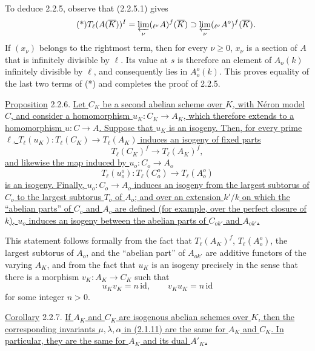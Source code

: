 To deduce 2.2.5, observe that (2.2.5.1) gives
\begin{equation}\tag{*}
 T_\ell(A(\overline K))^I
 =\varprojlim_\nu({}_{\ell^\nu}A)^f(\overline K)
 \supset\varprojlim_\nu({}_{\ell^\nu}A^o)^f(\overline K).
\end{equation}
If $(x_\nu)$ belongs to the rightmost term, then for every
$\nu\geq0$, $x_\nu$ is a section of $A$ that is infinitely divisible
by $\ell$.  Its value at $s$ is therefore an element of $A_o(k)$
infinitely divisible by $\ell$, and consequently lies in $A_o^o(k)$.
This proves equality of the last two terms of (*) and completes the
proof of 2.2.5.

\medskip
\noindent
\underline{Proposition} 2.2.6. \underline{Let $C_K$ be a second
abelian scheme over $K$, with N\'{e}ron model $C$, and consider a
homomorphism $u_K:C_K\longrightarrow A_K$, which therefore extends to
a homomorphism $u:C\longrightarrow A$.  Suppose that $u_K$ is an
isogeny.  Then, for every prime $\ell$,
$T_\ell(u_K):T_\ell(C_K)\longrightarrow T_\ell(A_K)$ induces an
isogeny of fixed parts}
\begin{equation}\tag{2.2.6.1}
 T_\ell(C_K)^f\longrightarrow T_\ell(A_K)^f,
\end{equation}
\underline{and likewise the map induced by
$u_o:C_o\longrightarrow A_o$}
\begin{equation}\tag{2.2.6.2}
 T_\ell(u_o^o):T_\ell(C_o^o)\longrightarrow T_\ell(A_o^o)
\end{equation}
\underline{is an isogeny.  Finally, $u_o:C_o\longrightarrow A_o$
induces an isogeny from the largest subtorus of $C_o$ to the largest
subtorus $T_o$ of $A_o$; and over an extension $k'/k$ on which the
``abelian parts'' of $C_o$ and $A_o$ are defined (for example, over
the perfect closure of $k$), $u_o$ induces an isogeny between the
abelian parts of $C_{ok'}$ and $A_{ok'}$.}

This statement follows formally from the fact that
$T_\ell(A_K)^f$, $T_\ell(A_o^o)$, the largest subtorus of $A_o$, and
the ``abelian part'' of $A_{ok'}$ are additive functors of the varying
$A_K$, and from the fact that $u_K$ is an isogeny precisely in the
sense that there is a morphism $v_K:A_K\longrightarrow C_K$ such that
\[
 u_Kv_K=n\,\mathrm{id},\qquad v_Ku_K=n\,\mathrm{id}
\]
for some integer $n>0$.

\medskip
\noindent
\underline{Corollary} 2.2.7. \underline{If $A_K$ and $C_K$ are
isogenous abelian schemes over $K$, then the corresponding invariants
$\mu,\lambda,\alpha$ in (2.1.11) are the same for $A_K$ and $C_K$.
In particular, they are the same for $A_K$ and its dual $A'_K$.}

